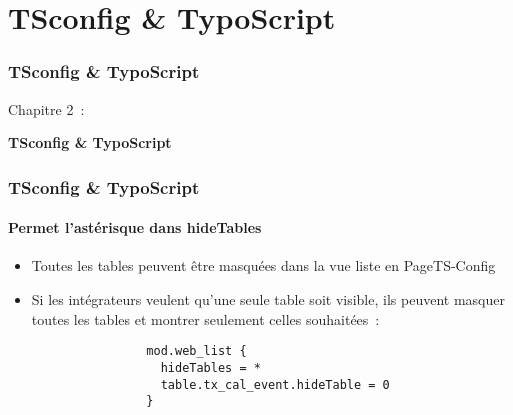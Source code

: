 %

\section{TSconfig \& TypoScript}
\begin{frame}[fragile]
	\frametitle{TSconfig \& TypoScript}

	\begin{center}\huge{Chapitre 2~:}\end{center}
	\begin{center}\huge{\color{typo3darkgrey}\textbf{TSconfig \& TypoScript}}\end{center}

\end{frame}

\begin{frame}[fragile]
	\frametitle{TSconfig \& TypoScript}
	\framesubtitle{Permet l'astérisque dans hideTables}

	\lstset{basicstyle=\tiny\ttfamily}

	\begin{itemize}
		\item Toutes les tables peuvent être masquées dans la vue liste en
			PageTS-Config

		\item Si les intégrateurs veulent qu'une seule table soit visible,
			ils peuvent masquer toutes les tables et montrer seulement celles souhaitées~:

			\begin{lstlisting}
				mod.web_list {
				  hideTables = *
				  table.tx_cal_event.hideTable = 0
				}
			\end{lstlisting}

	\end{itemize}

\end{frame}

